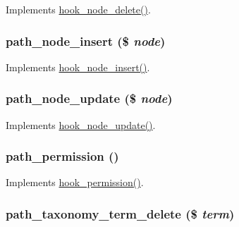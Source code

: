 \label{path_8module_a4b474a9f9d1b6a2e456025830f0c18de}
Implements \hyperlink{group__node__api__hooks_ga66ea0473a9950dc961802e801e5042e9}{hook\_\-node\_\-delete()}. \hypertarget{path_8module_adfa9f770accf52fe38e8b5e1584d1be1}{
\subsubsection[{path\_\-node\_\-insert}]{\setlength{\rightskip}{0pt plus 5cm}path\_\-node\_\-insert (\$ {\em node})}}
\label{path_8module_adfa9f770accf52fe38e8b5e1584d1be1}
Implements \hyperlink{group__node__api__hooks_ga8b40dc62e46e5055c205d2a723dc3548}{hook\_\-node\_\-insert()}. \hypertarget{path_8module_a1ad202fd90097a64c90c79cf5f01b852}{
\subsubsection[{path\_\-node\_\-update}]{\setlength{\rightskip}{0pt plus 5cm}path\_\-node\_\-update (\$ {\em node})}}
\label{path_8module_a1ad202fd90097a64c90c79cf5f01b852}
Implements \hyperlink{group__node__api__hooks_gac66c767cc922fcbfdaf17252e5d87d9d}{hook\_\-node\_\-update()}. \hypertarget{path_8module_a181c4caf27e3aae5d7ca27d7cd5969ad}{
\subsubsection[{path\_\-permission}]{\setlength{\rightskip}{0pt plus 5cm}path\_\-permission ()}}
\label{path_8module_a181c4caf27e3aae5d7ca27d7cd5969ad}
Implements \hyperlink{group__hooks_ga2b22b45f4925f2478412477bae329713}{hook\_\-permission()}. \hypertarget{path_8module_ad281728f6950698548fbe837b9e17444}{
\subsubsection[{path\_\-taxonomy\_\-term\_\-delete}]{\setlength{\rightskip}{0pt plus 5cm}path\_\-taxonomy\_\-term\_\-delete (\$ {\em term})}}
